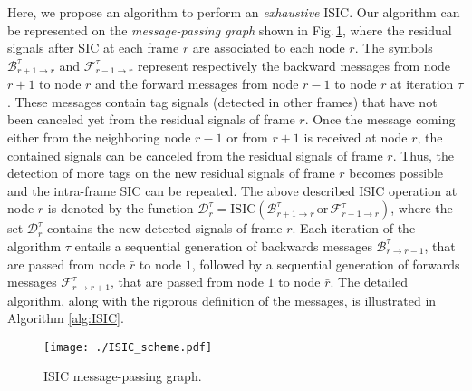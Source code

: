 \documentclass[12pt,draftcls,onecolumn]{IEEEtran}
\begin{document}
 Here, we propose an algorithm to perform an \emph{exhaustive} ISIC. Our algorithm  can be represented on the \emph{message-passing graph} shown in Fig.\,\ref{fig:ISIC}, where the residual signals after SIC at each frame $r$ are associated to each node $r$. The symbols $\mathcal{B}_{r+1\rightarrow r}^{\tau}$ and $\mathcal{F}_{r-1\rightarrow r}^{\tau}$ represent respectively the backward messages from node $r+1$ to node $r$ and the forward messages from node $r-1$ to node $r$ at iteration $\tau$. These messages contain tag signals (detected in other frames) that have not been canceled yet from the residual signals of frame $r$. Once the message coming either from the neighboring node $r-1$ or from $r+1$ is received at node $r$, the contained signals can be canceled from the residual signals of frame $r$. Thus, the detection of more tags on the new residual signals of frame $r$ becomes possible and the intra-frame SIC can be repeated. The above described ISIC operation at node $r$ is denoted by the function
$\mathcal{D}_{r}^{\tau}=\mathrm{ISIC}(\mathcal{B}_{r+1\rightarrow r}^{\tau} \, \mathrm{or} \, \mathcal{F}_{r-1\rightarrow r}^{\tau})$,
where the set $\mathcal{D}_{r}^{\tau}$ contains the new detected signals of frame $r$. Each iteration of the algorithm $\tau$ entails a sequential generation of backwards messages  $\mathcal{B}_{r\rightarrow r-1}^{\tau}$, that are passed from node $\bar{r}$ to node $1$, followed by a sequential generation of forwards messages $\mathcal{F}_{r\rightarrow r+1}^{\tau}$, that are passed from node $1$ to node $\bar{r}$. The detailed algorithm, along with the rigorous definition of the messages, is illustrated in Algorithm \ref{alg:ISIC}.




 \begin{figure}[tb]
\centering
\texttt{[image: ./ISIC\_scheme.pdf]}

\caption{ISIC message-passing graph. }
\label{fig:ISIC}
\end{figure}
\end{document}
